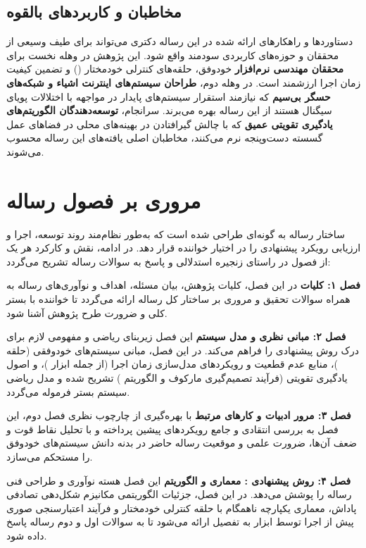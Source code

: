 \documentclass[oneside,openany,phd]{TMU-Thesis}
\begin{document}
\subsection*{مخاطبان و کاربردهای بالقوه}

دستاوردها و راهکارهای ارائه شده در این رساله دکتری می‌تواند برای طیف وسیعی از محققان و حوزه‌های کاربردی سودمند واقع شود. این پژوهش در وهله نخست برای \textbf{محققان مهندسی نرم‌افزار} خودوفق، حلقه‌های کنترلی خودمختار () و تضمین کیفیت زمان اجرا ارزشمند است. در وهله دوم، \textbf{طراحان سیستم‌های اینترنت اشیاء و شبکه‌های حسگر بی‌سیم} که نیازمند استقرار سیستم‌های پایدار در مواجهه با اختلالات پویای سیگنال هستند از این رساله بهره می‌برند. سرانجام، \textbf{توسعه‌دهندگان الگوریتم‌های یادگیری تقویتی عمیق} که با چالش گیرافتادن در بهینه‌های محلی در فضاهای عمل گسسته دست‌وپنجه نرم می‌کنند، مخاطبان اصلی یافته‌های این رساله محسوب می‌شوند.

\section{مروری بر فصول رساله}

ساختار رساله به گونه‌ای طراحی شده است که به‌طور نظام‌مند روند توسعه، اجرا و ارزیابی رویکرد پیشنهادی را در اختیار خواننده قرار دهد. در ادامه، نقش و کارکرد هر یک از فصول در راستای زنجیره استدلالی و پاسخ به سوالات رساله تشریح می‌گردد:

\textbf{فصل ۱: کلیات}
در این فصل، کلیات پژوهش، بیان مسئله، اهداف و نوآوری‌های رساله به همراه سوالات تحقیق و مروری بر ساختار کل رساله ارائه می‌گردد تا خواننده با بستر کلی و ضرورت طرح پژوهش آشنا شود.

\textbf{فصل ۲: مبانی نظری و مدل سیستم}
این فصل زیربنای ریاضی و مفهومی لازم برای درک روش پیشنهادی را فراهم می‌کند. در این فصل، مبانی سیستم‌های خودوفقی (حلقه )، منابع عدم قطعیت و رویکردهای مدل‌سازی زمان اجرا (از جمله ابزار )، و اصول یادگیری تقویتی (فرآیند تصمیم‌گیری مارکوف و الگوریتم ) تشریح شده و مدل ریاضی سیستم بستر  فرموله می‌گردد.

\textbf{فصل ۳: مرور ادبیات و کارهای مرتبط}
با بهره‌گیری از چارچوب نظری فصل دوم، این فصل به بررسی انتقادی و جامع رویکردهای پیشین پرداخته و با تحلیل نقاط قوت و ضعف آن‌ها، ضرورت علمی و موقعیت رساله حاضر در بدنه دانش سیستم‌های خودوفق را مستحکم می‌سازد.

\textbf{فصل ۴: روش پیشنهادی : معماری و الگوریتم}
این فصل هسته نوآوری و طراحی فنی رساله را پوشش می‌دهد. در این فصل، جزئیات الگوریتمی مکانیزم شکل‌دهی تصادفی پاداش، معماری یکپارچه ناهمگام با حلقه کنترلی خودمختار و فرآیند اعتبارسنجی صوری پیش از اجرا توسط ابزار  به تفصیل ارائه می‌شود تا به سوالات اول و دوم رساله پاسخ داده شود.
\end{document}
